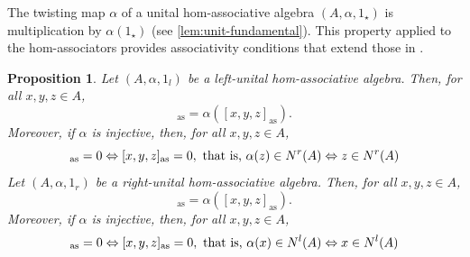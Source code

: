 \documentclass[12pt]{article}
\newtheorem{proposition}[theorem]{Proposition}
\begin{document}
		
		The twisting map $\alpha$ of a unital hom-associative algebra $(A,\alpha,1_\star)$ is multiplication by $\alpha(1_\star)$ (see \cref{lem:unit-fundamental}). This property applied to the hom-associators provides associativity conditions that extend those in \cite[Proposition 1.1]{FreGohr:UnitCond}.
		\begin{proposition}\label{prop:AssociatorsHomAssociators}
			Let $(A,\alpha,1_l)$ be a left-unital hom-associative algebra. Then, for all $x,y,z\in A$,
			\begin{equation*}
				[x,y,\alpha(z)]_{\mathrm{as}}=\alpha([x,y,z]_{\mathrm{as}}).
			\end{equation*}
			Moreover, if $\alpha$ is injective, then, for all $x,y,z\in A$,
			\begin{equation*}
				[x,y,\alpha(z)]_{\mathrm{as}}=0\Leftrightarrow [x,y,z]_{\mathrm{as}}=0, \textnormal{ that is, }\alpha(z)\in N^r(A)\Leftrightarrow z\in N^r(A)
			\end{equation*}
			Let $(A,\alpha,1_r)$ be a right-unital hom-associative algebra. Then, for all $x,y,z\in A$,
			\begin{equation*}
				[\alpha(x),y,z]_{\mathrm{as}}=\alpha([x,y,z]_{\mathrm{as}}).
			\end{equation*}
			Moreover, if $\alpha$ is injective, then, for all $x,y,z\in A$,
			\begin{equation*}
				[\alpha(x),y,z]_{\mathrm{as}}=0\Leftrightarrow [x,y,z]_{\mathrm{as}}=0, \textnormal{ that is, }\alpha(x)\in N^l(A)\Leftrightarrow x\in N^l(A)
			\end{equation*}
		\end{proposition}
\end{document}

